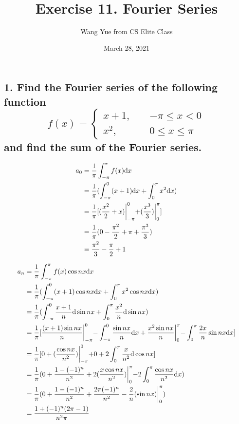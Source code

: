\documentclass{article}
\begin{document}
    \title{Exercise 11. Fourier Series}
    \author{Wang Yue from CS Elite Class}
    \date{March 28, 2021}
    \maketitle

    \subsection*{1. Find the Fourier series of the following function$$f(x) = \left\{ \begin{array}{ll}
        x + 1, \quad &-\pi \leq x < 0 \\
        x^2, \quad &0 \leq x \leq \pi
    \end{array}\right.$$and find the sum of the Fourier series.}

    $$\begin{aligned}
        a_0 &= \frac{1}{\pi} \int_{-\pi}^{\pi} f(x) \textrm dx \\
        &= \frac 1 \pi (\int_{-\pi}^0 (x + 1) \textrm dx + \int_0^\pi x^2 \textrm dx) \\
        &= \frac 1 \pi [(\frac{x^2}{2} + x)\biggl|_{-\pi}^0 + (\frac{x^3}{3})\biggl|_0^\pi] \\
        &= \frac 1 \pi (0 - \frac{\pi^2}{2} + \pi + \frac{\pi^3}{3}) \\
        &= \frac{\pi^2}{3} - \frac{\pi}{2} + 1
    \end{aligned}$$

    $$\begin{aligned}
        a_n &= \frac 1 \pi \int_{-\pi}^{\pi}f(x)\cos nx\textrm dx \\
        &= \frac 1 \pi (\int_{-\pi}^0 (x+1)\cos nx \textrm dx + \int_0^\pi x^2\cos nx \textrm dx) \\
        &= \frac 1 \pi (\int_{-\pi}^0 \frac{x+1}{n} \textrm d\sin nx + \int_0^\pi \frac{x^2}{n}\textrm d\sin nx) \\
        &= \frac 1 \pi [\frac{(x+1) \sin nx}{n}\biggl|_{-\pi}^0 - \int_{-\pi}^0 \frac{\sin nx}{n} \textrm dx + \frac{x^2\sin nx}{n} \biggl|_0^\pi - \int_0^\pi \frac{2x}{n}\sin nx \textrm dx] \\
        &= \frac 1 \pi [0 + (\frac{\cos nx}{n^2})\biggl|_{-\pi}^0 + 0 + 2\int_0^\pi \frac{x}{n^2}\textrm d\cos nx] \\
        &= \frac 1 \pi (0 + \frac{1- (-1)^{n}}{n^2} + 2 (\frac{x\cos nx}{n^2})\biggl|_0^\pi - 2\int_0^\pi \frac{\cos nx}{n^2}\textrm dx) \\
        &= \frac 1 \pi (0 + \frac{1- (-1)^{n}}{n^2} + \frac{2\pi(-1)^n}{n^2} - \frac{2}{n}(\sin nx)\biggl|_0^\pi) \\
        &= \frac{1 + (-1)^n(2\pi - 1)}{n^2\pi}
    \end{aligned}$$
\end{document}
